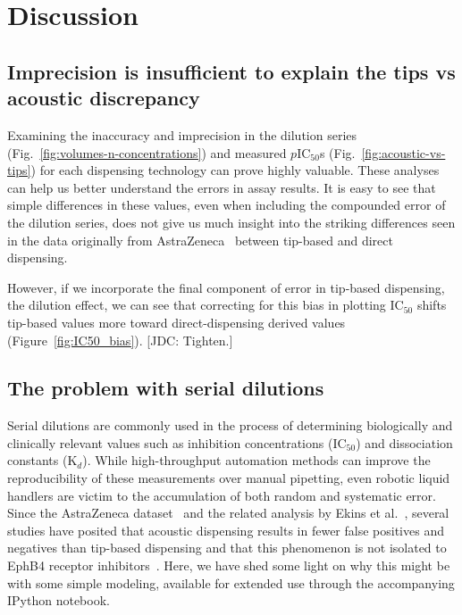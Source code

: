 \documentclass[aps,pre,twocolumn,nofootinbib,superscriptaddress,linenumbers]{revtex4-1}
\begin{document}
\section{Discussion}

\subsection*{Imprecision is insufficient to explain the tips vs acoustic discrepancy}

Examining the inaccuracy and imprecision in the dilution series (Fig.~\ref{fig:volumes-n-concentrations}) and measured $p$IC$_{50}$s (Fig.~\ref{fig:acoustic-vs-tips}) for each dispensing technology can prove highly valuable.
These analyses can help us better understand the errors in assay results.
It is easy to see that simple differences in these values, even when including the compounded error of the dilution series, does not give us much insight into the striking differences seen in the data originally from AstraZeneca~\cite{ekins_dispensing_2013,barlaam_novel_2009,barlaam_pyrimidine_2010} between tip-based and direct dispensing.

However, if we incorporate the final component of error in tip-based dispensing, the dilution effect, we can see that correcting for this bias in plotting IC$_{50}$ shifts tip-based values more toward direct-dispensing derived values (Figure~\ref{fig:IC50_bias}).
{\color{red}[JDC: Tighten.]}

\subsection*{The problem with serial dilutions}

Serial dilutions are commonly used in the process of determining biologically and clinically relevant values such as inhibition concentrations (IC$_{ 50}$)  and dissociation constants (K$_{d}$). 
While high-throughput automation methods can improve the reproducibility of these measurements over manual pipetting, even robotic liquid handlers are victim to the accumulation of both random and systematic error.
Since the AstraZeneca dataset~\cite{barlaam_novel_2009,barlaam_pyrimidine_2010} and the related analysis by Ekins et al.~\cite{ekins_dispensing_2013}, several studies have posited that acoustic dispensing results in fewer false positives and negatives than tip-based dispensing and that this phenomenon is not isolated to EphB4 receptor inhibitors~\cite{wingfield_impact_2012,olechno_direct_2013,olechno_sound_2013,olechno_improving_2006}. 
Here, we have shed some light on why this might be with some simple modeling, available for extended use through the accompanying IPython notebook.
\end{document}
